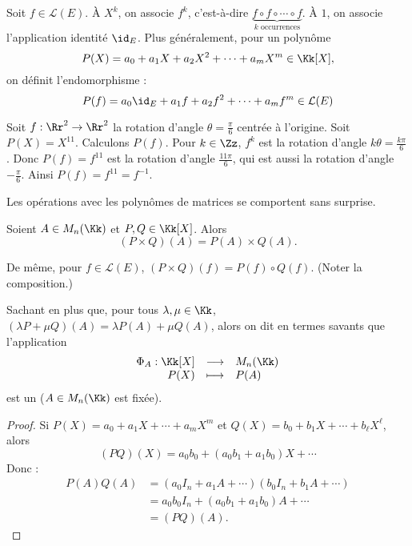 \documentclass[12pt, class=report,crop=false]{standalone}
\begin{document}
\bigskip


Soit $f \in \mathcal{L}(E)$.
\`A $X^k$, on associe $f^k$, c'est-à-dire $\underbrace{f\circ f \circ \cdots \circ f}_{k \text{ occurrences}}$. \`A $1$, on associe l'application identité $\id_E$.
Plus généralement, pour un polynôme
\[P(X) = a_0 + a_1 X +a_2 X^2 + \cdots  + a_m X^m \in\Kk[X],\]
on définit l'endomorphisme :
\[P(f) = a_0 \id_E +a_1 f +a_2 f^2 +  \cdots +a_m f^m \in \mathcal{L}(E) \] 

 
\begin{exemple}
Soit $f : \Rr^2 \to \Rr^2$ la rotation d'angle $\theta = \frac{\pi}{6}$ centrée à l'origine.
Soit $P(X) = X^{11}$. Calculons $P(f)$.
Pour $k \in \Zz$, $f^k$ est la rotation d'angle $k\theta = \frac{k\pi}{6}$.
Donc $P(f) = f^{11}$ est la rotation d'angle $\frac{11\pi}{6}$, qui est aussi la rotation d'angle
$-\frac{\pi}{6}$. Ainsi $P(f) = f^{11} = f^{-1}$.
\end{exemple}


Les opérations avec les polynômes de matrices se comportent sans surprise.
\begin{proposition}
Soient $A \in M_n(\Kk)$ et $P,Q \in \Kk[X]$. Alors  
\[(P \times Q)(A) = P(A) \times Q(A).\]
\end{proposition}

De même, pour $f \in \mathcal{L}(E)$, $(P \times Q)(f) = P(f) \circ Q(f)$. (Noter la composition.)

Sachant en plus que, pour tous $\lambda,\mu\in\Kk$, $(\lambda P + \mu Q)(A) = \lambda P(A) +\mu Q(A)$, alors on dit en termes savants que l'application 
\[\begin{array}{rcl}
\Phi_A : \Kk[X] & \longrightarrow & M_n(\Kk) \\
P(X) & \longmapsto & P(A)
\end{array}
\]
est un  ($A \in M_n(\Kk)$ est fixée).

\begin{proof}
Si $P(X) = a_0 + a_1X + \cdots + a_mX^m$ et $Q(X) = b_0 + b_1X + \cdots + b_\ell X^\ell$, 
alors 
$$(PQ)(X) = a_0b_0 +(a_0 b_1 + a_1b_0) X + \cdots$$ 
Donc :
\begin{align*}
P(A) Q(A)
  &= (a_0 I_n + a_1 A + \cdots)(b_0 I_n +b_1 A + \cdots) \\
  &= a_0b_0 I_n + (a_0b_1 + a_1b_0) A + \cdots \\  
  &= (PQ)(A) .
\end{align*}
\end{proof}
\end{document}
